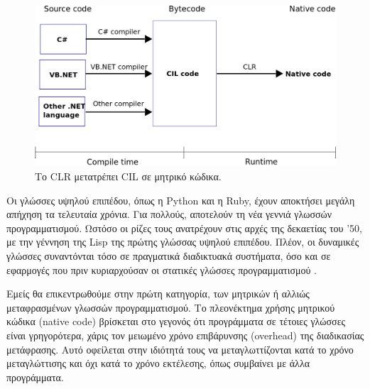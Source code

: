 \begin{figure}[H]
    \includegraphics[scale=0.3]{figures/clr-converts-language-to-native-code.png}
    \centering
    \caption{Το CLR μετατρέπει CIL σε μητρικό κώδικα.}
    \label{clr}
\end{figure}

Οι γλώσσες υψηλού επιπέδου, όπως η Python και η Ruby, έχουν αποκτήσει μεγάλη απήχηση τα τελευταία χρόνια. Για πολλούς, αποτελούν τη νέα γεννιά γλωσσών προγραμματισμού. Ωστόσο οι ρίζες τους ανατρέχουν στις αρχές της δεκαετίας του '50, με την γέννηση της Lisp της πρώτης γλώσσας υψηλού επιπέδου. Πλέον, οι δυναμικές γλώσσες συναντόνται τόσο σε πραγματικά διαδικτυακά συστήματα, όσο και σε εφαρμογές που πριν κυριαρχούσαν οι στατικές γλώσσες προγραμματισμού \cite{[ADV09]}.

Εμείς θα επικεντρωθούμε στην πρώτη κατηγορία, των μητρικών ή αλλιώς μεταφρασμένων γλωσσών προγραμματισμού. Το πλεονέκτημα χρήσης μητρικού κώδικα (native code) βρίσκεται στο γεγονός ότι προγράμματα σε τέτοιες γλώσσες είναι γρηγορότερα, χάρις τον μειωμένο χρόνο επιβάρυνσης (overhead) της διαδικασίας μετάφρασης. Αυτό οφείλεται στην ιδιότητά τους να μεταγλωττίζονται κατά το χρόνο μεταγλώττισης και όχι κατά το χρόνο εκτέλεσης, όπως συμβαίνει με άλλα προγράμματα.

